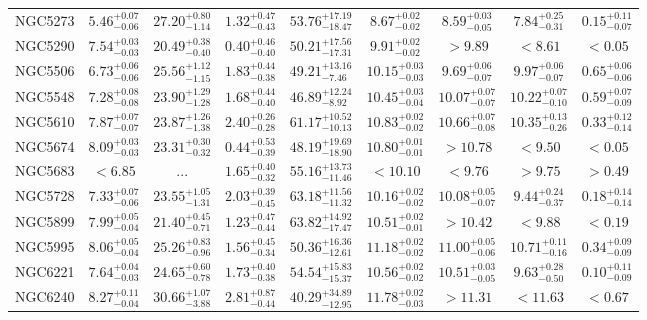 \documentclass[onecolumn]{mn2e}
\begin{document}
{\begin{center}
\begin{longtable}{lcccccccc}
NGC5273 & $5.46_{-0.06}^{+0.07}$ & $27.20_{-1.14}^{+0.80}$ & $1.32_{-0.43}^{+0.47}$ &$53.76_{-18.47}^{+17.19}$ & $8.67_{-0.02}^{+0.02}$ & $8.59_{-0.05}^{+0.03}$ & $7.84_{-0.31}^{+0.25}$ & $0.15_{-0.07}^{+0.11}$ \\
NGC5290 & $7.54_{-0.03}^{+0.03}$ & $20.49_{-0.40}^{+0.38}$ & $0.40_{-0.40}^{+0.46}$ &$50.21_{-17.31}^{+17.56}$ & $9.91_{-0.02}^{+0.02}$ & $>9.89$ & $<8.61$ & $<0.05$ \\
NGC5506 & $6.73_{-0.06}^{+0.06}$ & $25.56_{-1.15}^{+1.12}$ & $1.83_{-0.38}^{+0.44}$ &$49.21_{-7.46}^{+13.16}$ & $10.15_{-0.03}^{+0.03}$ & $9.69_{-0.07}^{+0.06}$ & $9.97_{-0.07}^{+0.06}$ & $0.65_{-0.06}^{+0.06}$ \\
NGC5548 & $7.28_{-0.08}^{+0.08}$ & $23.90_{-1.28}^{+1.29}$ & $1.68_{-0.40}^{+0.44}$ &$46.89_{-8.92}^{+12.24}$ & $10.45_{-0.04}^{+0.03}$ & $10.07_{-0.07}^{+0.07}$ & $10.22_{-0.10}^{+0.07}$ & $0.59_{-0.09}^{+0.07}$ \\
NGC5610 & $7.87_{-0.07}^{+0.07}$ & $23.87_{-1.38}^{+1.26}$ & $2.40_{-0.28}^{+0.26}$ &$61.17_{-10.13}^{+10.52}$ & $10.83_{-0.02}^{+0.02}$ & $10.66_{-0.08}^{+0.07}$ & $10.35_{-0.26}^{+0.13}$ & $0.33_{-0.14}^{+0.12}$ \\
NGC5674 & $8.09_{-0.03}^{+0.03}$ & $23.31_{-0.32}^{+0.30}$ & $0.44_{-0.39}^{+0.53}$ &$48.19_{-18.90}^{+19.69}$ & $10.80_{-0.01}^{+0.01}$ & $>10.78$ & $<9.50$ & $<0.05$ \\
NGC5683 & $<6.85$ & ... & $1.65_{-0.32}^{+0.40}$ &$55.16_{-11.46}^{+13.73}$ & $<10.10$ & $<9.76$ & $>9.75$ & $>0.49$ \\
NGC5728 & $7.33_{-0.06}^{+0.07}$ & $23.55_{-1.31}^{+1.05}$ & $2.03_{-0.45}^{+0.39}$ &$63.18_{-11.32}^{+11.56}$ & $10.16_{-0.02}^{+0.02}$ & $10.08_{-0.07}^{+0.05}$ & $9.44_{-0.37}^{+0.24}$ & $0.18_{-0.14}^{+0.14}$ \\
NGC5899 & $7.99_{-0.04}^{+0.05}$ & $21.40_{-0.71}^{+0.45}$ & $1.23_{-0.44}^{+0.47}$ &$63.82_{-17.47}^{+14.92}$ & $10.51_{-0.01}^{+0.02}$ & $>10.42$ & $<9.88$ & $<0.19$ \\
NGC5995 & $8.06_{-0.04}^{+0.05}$ & $25.26_{-0.96}^{+0.83}$ & $1.56_{-0.34}^{+0.45}$ &$50.36_{-12.61}^{+16.36}$ & $11.18_{-0.02}^{+0.02}$ & $11.00_{-0.06}^{+0.05}$ & $10.71_{-0.16}^{+0.11}$ & $0.34_{-0.09}^{+0.09}$ \\
NGC6221 & $7.64_{-0.03}^{+0.04}$ & $24.65_{-0.78}^{+0.60}$ & $1.73_{-0.38}^{+0.40}$ &$54.54_{-15.37}^{+15.83}$ & $10.56_{-0.02}^{+0.02}$ & $10.51_{-0.05}^{+0.03}$ & $9.63_{-0.50}^{+0.28}$ & $0.10_{-0.09}^{+0.11}$ \\
NGC6240 & $8.27_{-0.04}^{+0.11}$ & $30.66_{-3.88}^{+1.07}$ & $2.81_{-0.44}^{+0.87}$ &$40.29_{-12.95}^{+34.89}$ & $11.78_{-0.03}^{+0.02}$ & $>11.31$ & $<11.63$ & $<0.67$ \\

\end{longtable}
\end{center}}
\end{document}
